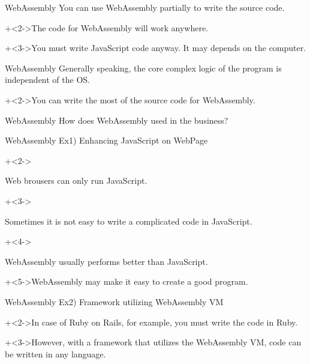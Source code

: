 \begin{frame}{WebAssembly}{}
    You can use WebAssembly partially to write the source code.
    \vspace{4ex}

    \onslide+<2->{The code for WebAssembly will work anywhere.}
    \vspace{4ex}

    \onslide+<3->{You must write JavaScript code anyway. It may depends on the computer.}
\end{frame}


\begin{frame}{WebAssembly}{}
    Generally speaking, the core complex logic of the program is independent of the OS.
    \vspace{4ex}

    \onslide+<2->{You can write the most of the source code for WebAssembly.}
\end{frame}


\begin{frame}{WebAssembly}{}
    {\Large How does WebAssembly used in the business?}
\end{frame}


\begin{frame}{WebAssembly}{}
    Ex1) Enhancing JavaScript on WebPage
    \vspace{4ex}

    \begin{itemize}
        \onslide+<2->{\item Web brousers can only run JavaScript.}
        \onslide+<3->{\item Sometimes it is not easy to write a complicated code in JavaScript.}
        \onslide+<4->{\item WebAssembly usually performs better than JavaScript.}
    \end{itemize}
    \vspace{4ex}

    \onslide+<5->{WebAssembly may make it easy to create a good program.}
\end{frame}


\begin{frame}{WebAssembly}{}
    Ex2) Framework utilizing WebAssembly VM
    \vspace{4ex}

    \onslide+<2->{In case of Ruby on Rails, for example, you must write the code in Ruby.}
    \vspace{4ex}

    \onslide+<3->{However, with a framework that utilizes the WebAssembly VM, code can be written in any language.}
\end{frame}


